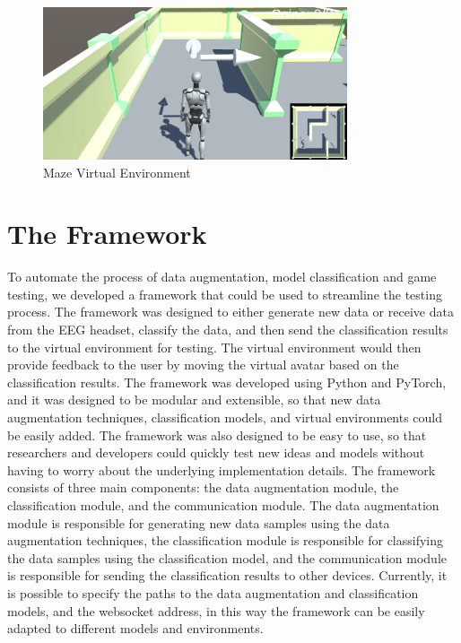 \begin{figure}[!htbp]
    \centering
    \includegraphics[width=0.8\textwidth]{Figures/Approach/maze}
    \caption{Maze Virtual Environment}
    \label{fig:maze}
\end{figure}

\section{The Framework}
To automate the process of data augmentation, model classification and game testing, we developed a framework that could be used to streamline the testing process.
The framework was designed to either generate new data or receive data from the EEG headset, classify the data, and then send the classification results to the virtual environment for testing.
The virtual environment would then provide feedback to the user by moving the virtual avatar based on the classification results.
The framework was developed using Python and PyTorch, and it was designed to be modular and extensible, so that new data augmentation techniques, classification models, and virtual environments could be easily added.
The framework was also designed to be easy to use, so that researchers and developers could quickly test new ideas and models without having to worry about the underlying implementation details.
The framework consists of three main components: the data augmentation module, the classification module, and the communication module.
The data augmentation module is responsible for generating new data samples using the data augmentation techniques, the classification module is responsible for classifying the data samples using the classification model, and the communication module is responsible for sending the classification results to other devices.
Currently, it is possible to specify the paths to the data augmentation and classification models, and the websocket address, in this way the framework can be easily adapted to different models and environments.

